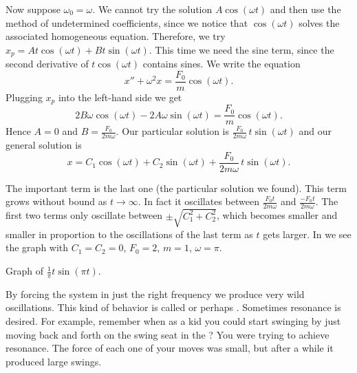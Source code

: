 Now suppose $\omega_0 = \omega$.  We cannot try
the solution $A \cos (\omega t)$ and then use the method of undetermined
coefficients, since we notice that $\cos (\omega t)$ solves the associated
homogeneous equation.  Therefore,
we 
try $x_p = A t \cos (\omega t) + B t \sin (\omega t)$.  This time we need
the sine
term, since the second derivative of $t \cos (\omega t)$ contains sines.
We write the equation
\begin{equation*}
x'' + \omega^2 x = \frac{F_0}{m} \cos ( \omega t) .
\end{equation*}
Plugging $x_p$ into the left-hand side we get
\begin{equation*}
2 B \omega \cos (\omega t) - 2 A \omega \sin (\omega t) = 
\frac{F_0}{m} \cos (\omega t) .
\end{equation*}
Hence $A = 0$ and $B = \frac{F_0}{2m\omega}$.  Our particular solution is
$\frac{F_0}{2m\omega} \, t \sin (\omega t)$ and our general solution is
\begin{equation*}
x = C_1 \cos (\omega t) + C_2 \sin (\omega t)
+ \frac{F_0}{2m\omega} \, t \sin (\omega t) .
\end{equation*}

The important term is the last one (the particular solution we found).  
This term grows without bound as $t \to \infty$.  In fact it
oscillates 
between $\frac{F_0 t}{2m\omega}$ and
$\frac{- F_0 t}{2m\omega}$.  The first two terms only oscillate between
$\pm\sqrt{C_1^2 + C_2^2}$, which becomes smaller and smaller in proportion to
the oscillations of the last term as $t$ gets larger.  In
 we see the graph with $C_1=C_2=0$, $F_0 = 2$,
$m=1$, $\omega = \pi$.

\begin{mywrapfig}{3.25in}
\capstart
{}
\caption{Graph of
$\frac{1}{\pi} t \sin (\pi t)$.\label{3.6:resonancefig}}
\end{mywrapfig}

By forcing the system in just the right frequency we produce very wild
oscillations.  This kind of behavior is called \emph{} or
perhaps
\emph{}.  Sometimes resonance is
desired.  For
example, remember when as a kid you could start swinging by just moving back
and forth on the swing seat in the ?  You were trying to
achieve resonance.  The force of each one of your moves was small, but after a
while it produced large swings.

